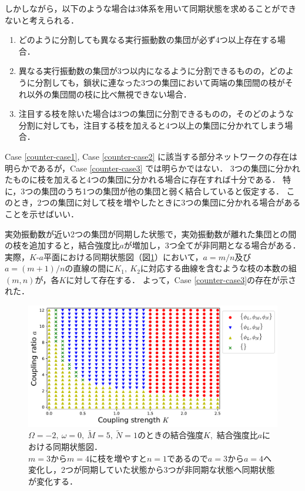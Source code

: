 \documentclass[../main]{subfiles}
\begin{document}
しかしながら，以下のような場合は3体系を用いて同期状態を求めることができないと考えられる．
\renewcommand{\labelenumi}{Case \theenumi}
\begin{enumerate}
    \item \label{counter-case1} 
    どのように分割しても異なる実行振動数の集団が必ず4つ以上存在する場合．
    \item \label{counter-case2}
    異なる実行振動数の集団が3つ以内になるように分割できるものの，どのように分割しても，鎖状に連なった3つの集団において両端の集団間の枝がそれ以外の集団間の枝に比べ無視できない場合．
    \item \label{counter-case3}
    注目する枝を除いた場合は3つの集団に分割できるものの，そのどのような分割に対しても，注目する枝を加えると4つ以上の集団に分かれてしまう場合．
\end{enumerate}

Case \ref{counter-case1}, Case \ref{counter-case2} に該当する部分ネットワークの存在は明らかであるが，Case \ref{counter-case3} では明らかではない．
3つの集団に分かれたものに枝を加えると4つの集団に分かれる場合に存在すれば十分である．
特に，3つの集団のうち1つの集団が他の集団と弱く結合していると仮定する．
このとき，2つの集団に対して枝を増やしたときに3つの集団に分かれる場合があることを示せばいい．

実効振動数が近い2つの集団が同期した状態で，実効振動数が離れた集団との間の枝を追加すると，結合強度比$a$が増加し，3つ全てが非同期となる場合がある．
実際，$K$-$a$平面における同期状態図（図\ref{fig:3body-phase-m5}）において，$a=m/n$及び$a=(m+1)/n$の直線の間に$K_1,\ K_2$に対応する曲線を含むような枝の本数の組$(m,n)$が，各$K$に対して存在する．
よって，Case \ref{counter-case3}の存在が示された．

\begin{figure}[tbp]
    \centering
    \includegraphics[width=135mm]{./images/three-body-phase-m5.pdf}
    \centering
    \caption{$\Omega=-2,\ \omega=0,\ \tilde{M}=5,\ \tilde{N}=1$のときの結合強度$K$,\ 結合強度比$a$における同期状態図．\\
    $m=3$から$m=4$に枝を増やすと$n=1$であるので$a=3$から$a=4$へ変化し，2つが同期していた状態から3つが非同期な状態へ同期状態が変化する．}
    \label{fig:3body-phase-m5}
\end{figure}
\end{document}
